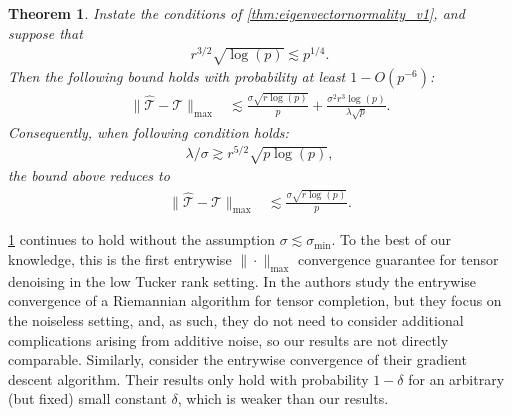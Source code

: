 \documentclass[10pt]{article}
\newcommand{\0}{{\mathbf{0}}}
\newcommand{\1}{{\mathbf{1}}}
\renewcommand{\citet}{\cite}
\newtheorem{theorem}{Theorem}
\renewcommand{\hat}{\widehat}
\renewcommand{\hat}{\widehat}
\begin{document}
\begin{theorem}\label{cor:maxnormbound_v1}
Instate the conditions of \cref{thm:eigenvectornormality_v1}, and suppose that
\begin{align*}
     r^{3/2} \sqrt{\log(p)} \lesssim p^{1/4}.
\end{align*}
Then the following bound holds with probability at least $1 - O(p^{-6})$:
\begin{align*}
    \| \mathcal{\hat T} - \mathcal{T} \|_{\max} &\lesssim \frac{\sigma \sqrt{r\log(p)}  }{p}  %
    + \frac{\sigma^2  r^3 \log(p)}{\lambda \sqrt{p}}. %
\end{align*}
Consequently, when following condition holds:
\begin{align*}
   \lambda/\sigma \gtrsim   r^{5/2} \sqrt{p\log(p)},
\end{align*}
the bound above reduces to
\begin{align*}
     \| \mathcal{\hat T} - \mathcal{T} \|_{\max} &\lesssim \frac{ \sigma \sqrt{r\log(p)}}{p}.
\end{align*}
\end{theorem}

\cref{cor:maxnormbound_v1} continues to hold without the assumption $\sigma \lesssim \sigma_{\min}$.  To the best of our knowledge, this is the first entrywise $\|\cdot \|_{\max}$ convergence guarantee for tensor denoising in the low Tucker rank setting.  In \citet{wang_implicit_2021} the authors study the entrywise convergence of a Riemannian algorithm for tensor completion, but they focus on the noiseless setting, and, as such, they do not need to consider additional complications arising from additive noise, so our results are not directly comparable.  Similarly, \citet{cai_nonconvex_2022} consider the entrywise convergence of their gradient descent algorithm. %
Their results only hold with probability $1 -\delta$ for an arbitrary (but fixed) small constant $\delta$, which is weaker than our results.  

\end{document}

